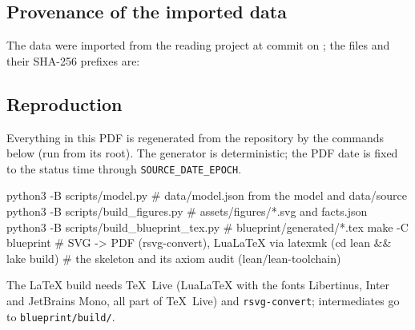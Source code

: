 \documentclass[11pt,a4paper,oneside]{article}
\makeatletter
\newcommand\bpcode[1]{\texttt{#1}}
\newcommand\bphash[1]{\texttt{\footnotesize\expandafter\seqsplit\expandafter{#1}}}
\def\seqsplit#1{\bp@seqsplit#1\@nil}
\def\bp@seqsplit#1{\ifx#1\@nil\else#1\hskip0pt plus 0.3pt\relax\expandafter\bp@seqsplit\fi}
\makeatother
\begin{document}
\subsection{Provenance of the imported data}
The data were imported from the reading project at commit \bphash{\SourceCommit} on \ImportedAt;
the files and their SHA-256 prefixes are:


\subsection{Reproduction}
Everything in this PDF is regenerated from the repository by the commands below (run from its root).
The generator is deterministic; the PDF date is fixed to the status time through
\bpcode{SOURCE\_DATE\_EPOCH}.
\begin{bpshell}
python3 -B scripts/model.py                 # data/model.json from the model and data/source
python3 -B scripts/build_figures.py         # assets/figures/*.svg and facts.json
python3 -B scripts/build_blueprint_tex.py   # blueprint/generated/*.tex
make -C blueprint                           # SVG -> PDF (rsvg-convert), LuaLaTeX via latexmk
(cd lean && lake build)                     # the skeleton and its axiom audit (lean/lean-toolchain)
\end{bpshell}
The LaTeX build needs TeX~Live (LuaLaTeX with the fonts Libertinus, Inter and JetBrains Mono, all part of
TeX~Live) and \bpcode{rsvg-convert}; intermediates go to \bpcode{blueprint/build/}.
\end{document}
